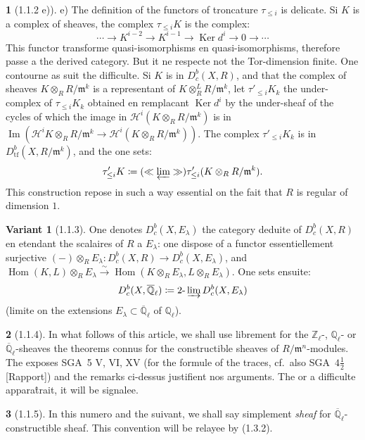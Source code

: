 \documentclass[12pt,a4paper]{article}
\theoremstyle{plain}
\theoremstyle{definition}
\newtheorem{var}[theorem]{Variant}
\theoremstyle{definition}
\newtheorem{para}{}[section]
\theoremstyle{remark}
\DeclareMathOperator{\Hom}{Hom}
\DeclareMathOperator{\Imm}{Im}
\DeclareMathOperator{\Ker}{Ker}
\newcommand{\limind}{\varinjlim}
\newcommand{\limproj}{\varprojlim}
\begin{document}
\begin{para}[1.1.2 e)]
e) The definition of the functors of troncature $\tau_{\leq i}$ is delicate. Si $K$ is a complex of sheaves, the complex $\tau_{\leq i} K$ is the complex:
\[\cdots \to K^{i-2} \to K^{i-1} \to \Ker d^i \to 0 \to \cdots\]
This functor transforme quasi-isomorphisms en quasi-isomorphisms, therefore passe a the derived category. But it ne respecte not the Tor-dimension finite. One contourne as suit the difficulte. Si $K$ is in $D^b_c(X, R)$, and that the complex of sheaves $K \otimes_R R/\mathfrak{m}^k$ is a representant of $K \otimes^L_R R/\mathfrak{m}^k$, let $\tau'_{\leq i} K_k$ the under-complex of $\tau_{\leq i} K_k$ obtained en remplacant $\Ker d^i$ by the under-sheaf of the cycles of which the image in $\mathscr{H}^i(K \otimes_R R/\mathfrak{m}^k)$ is in $\Imm(\mathscr{H}^i K \otimes_R R/\mathfrak{m}^k \to \mathscr{H}^i(K \otimes_R R/\mathfrak{m}^k))$. The complex $\tau'_{\leq i} K_k$ is in $D^b_{\text{tf}}(X, R/\mathfrak{m}^k)$, and the one sets:
\[\tau'_{\leq i} K \coloneqq (\ll \limproj \gg) \tau'_{\leq i}(K \otimes_R R/\mathfrak{m}^k).\]
This construction repose in such a way essential on the fait that $R$ is regular of dimension $1$.
\end{para}

\begin{var}[1.1.3]
One denotes $D^b_c(X, E_\lambda)$ the category deduite of $D^b_c(X, R)$ en etendant the scalaires of $R$ a $E_\lambda$: one dispose of a functor essentiellement surjective $(-) \otimes_R E_\lambda : D^b_c(X, R) \to D^b_c(X, E_\lambda)$, and $\Hom(K, L) \otimes_R E_\lambda \xrightarrow{\sim} \Hom(K \otimes_R E_\lambda, L \otimes_R E_\lambda)$. One sets ensuite:
\[D^b_c(X, \overline{\mathbb{Q}}_\ell) \coloneqq 2\text{-}\limind D^b_c(X, E_\lambda)\]
(limite on the extensions $E_\lambda \subset \overline{\mathbb{Q}}_\ell$ of $\mathbb{Q}_\ell$).
\end{var}

\begin{para}[1.1.4]
In what follows of this article, we shall use librement for the $\mathbb{Z}_\ell$-, $\mathbb{Q}_\ell$- or $\overline{\mathbb{Q}}_\ell$-sheaves the theorems connus for the constructible sheaves of $R/\mathfrak{m}^n$-modules. The exposes SGA~5 V, VI, XV (for the formule of the traces, cf.~also SGA~$4\frac{1}{2}$ [Rapport]) and the remarks ci-dessus justifient nos arguments. The or a difficulte appara\^trait, it will be signalee.
\end{para}

\begin{para}[1.1.5]
In this numero and the suivant, we shall say simplement \emph{sheaf} for $\overline{\mathbb{Q}}_\ell$-constructible sheaf. This convention will be relayee by (1.3.2).
\end{para}
\end{document}
